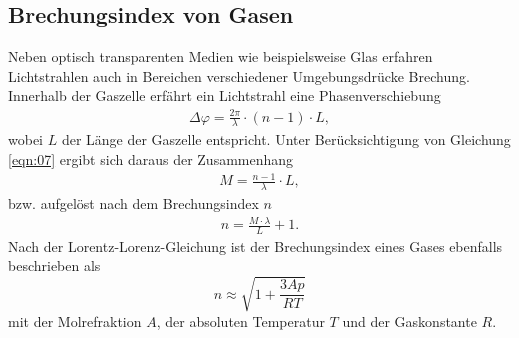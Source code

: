 \subsection{Brechungsindex von Gasen}
\noindent Neben optisch transparenten Medien wie beispielsweise Glas erfahren
Lichtstrahlen auch in Bereichen verschiedener Umgebungsdrücke Brechung.
Innerhalb der Gaszelle erfährt ein Lichtstrahl eine Phasenverschiebung
\begin{align}
  \Delta \varphi = \frac{2 \pi}{\lambda} \cdot (n - 1) \cdot L,
  \label{eqn:11}
\end{align}
\noindent wobei $L$ der Länge der Gaszelle entspricht. Unter Berücksichtigung
von Gleichung \ref{eqn:07} ergibt sich daraus der Zusammenhang
\begin{align}
  M = \frac{n-1}{\lambda} \cdot L,
  \label{eqn:12}
\end{align}
\noindent bzw. aufgelöst nach dem Brechungsindex $n$
\begin{align}
  n = \frac{M \cdot \lambda}{L} + 1.
  \label{eqn:13}
\end{align}
Nach der Lorentz-Lorenz-Gleichung ist der Brechungsindex eines Gases ebenfalls beschrieben als
\begin{equation}
  n \approx \sqrt{1+\frac{3 A p}{R T}}
  \label{eqn:Lorentz-Lorenz}
\end{equation}
mit der Molrefraktion $A$, der absoluten Temperatur $T$ und der Gaskonstante $R$.